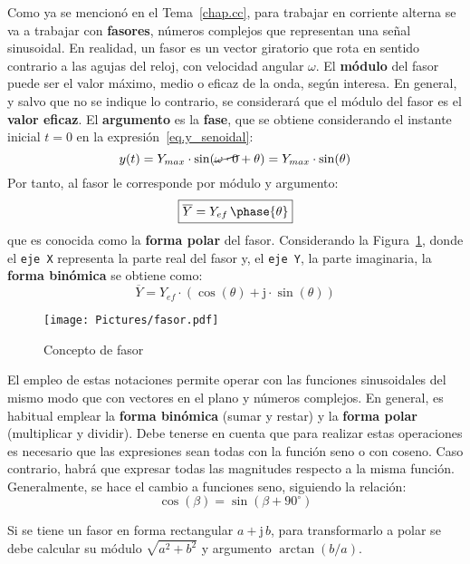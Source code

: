 \documentclass[11pt]{book} %
\numberwithin{dummy}{section}
\theoremstyle{ocrenumbox}
\theoremstyle{blacknumex}
\theoremstyle{blacknumbox}
\theoremstyle{ocrenum}
\newenvironment{remark}{\par\vspace{10pt}\small %
\begin{list}{}{
\leftmargin=35pt %
\rightmargin=25pt}\item\ignorespaces %
\makebox[-2.5pt]{\begin{tikzpicture}[overlay]
\node[draw=ocre!60,line width=1pt,circle,fill=ocre!25,font=\sffamily\bfseries,inner sep=2pt,outer sep=0pt] at (-15pt,0pt){\textcolor{ocre}{N}};\end{tikzpicture}} %
\advance\baselineskip -1pt}{\end{list}\vskip5pt} %
\newlength\esp
\begin{document}
	Como ya se mencionó en el Tema~\ref{chap.cc}, para trabajar en corriente alterna se va a trabajar con \textbf{fasores}, números complejos que representan una señal sinusoidal. En realidad, un fasor es un vector giratorio que rota en sentido contrario a las agujas del reloj, con velocidad angular $\omega$. El \textbf{módulo} del fasor puede ser el valor máximo, medio o eficaz de la onda, según interesa. En general, y salvo que no se indique lo contrario, se considerará que el módulo del fasor es el \textbf{valor eficaz}. El \textbf{argumento} es la \textbf{fase}, que se obtiene considerando el instante inicial $t=0$ en la expresión~\eqref{eq.y_senoidal}:
	\begin{equation*}
		y(t)=Y_{max}\cdot\sin(\cancel{\omega \cdot 0}+\theta)=Y_{max}\cdot\sin(\theta)
	\end{equation*}
	Por tanto, al fasor le corresponde por módulo y argumento:
	\begin{equation}
		\boxed{\overline{Y}=Y_{ef}\,\phase{\theta}}
	\end{equation}
	que es conocida como la \textbf{forma polar} del fasor. Considerando la Figura~\ref{fig.fasor}, donde el \texttt{eje X} representa la parte real del fasor y, el \texttt{eje Y}, la parte imaginaria, la \textbf{forma binómica} se obtiene como: 
	\begin{equation}
		\boxed{\overline{Y} = Y_{ef}\cdot(\cos(\theta)+\mathrm{j}\cdot\sin(\theta))}
	\end{equation}
	\begin{figure}[htbp]
		\centering
		\texttt{[image: Pictures/fasor.pdf]}
		\caption{Concepto de fasor}
		\label{fig.fasor}
	\end{figure}
	
	El empleo de estas notaciones permite operar con las funciones sinusoidales del mismo modo que con vectores en el plano y números complejos. En general, es habitual emplear la \textbf{forma binómica} (sumar y restar) y la \textbf{forma polar} (multiplicar y dividir). Debe tenerse en cuenta que para realizar estas operaciones es necesario que las expresiones sean todas con la función seno o con coseno. Caso contrario, habrá que expresar todas las magnitudes respecto a la misma función. Generalmente, se hace el cambio a funciones seno, siguiendo la relación: 
	\begin{equation*}
		\cos(\beta)=\sin(\beta+90^\circ)
	\end{equation*}
	\begin{remark}
		Si se tiene un fasor en forma rectangular $a+\mathrm{j}\,b$, para transformarlo a polar se debe calcular su módulo $\sqrt{a^2+b^2}$ y argumento $\arctan(b/a)$.
	\end{remark}
	
\end{document}
